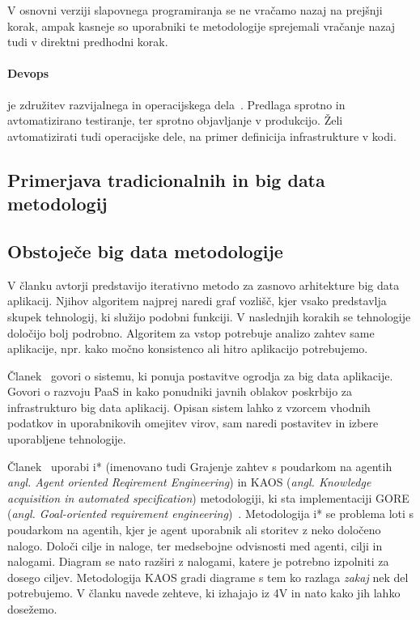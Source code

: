 V osnovni verziji slapovnega programiranja se ne vračamo nazaj na prejšnji korak,
ampak kasneje so uporabniki te metodologije
sprejemali vračanje nazaj tudi v direktni predhodni korak.

\paragraph{Devops} je združitev razvijalnega in operacijskega dela~\cite{devops_meth}.
Predlaga sprotno in avtomatizirano testiranje, ter sprotno objavljanje v produkcijo.
Želi avtomatizirati tudi operacijske dele,
na primer definicija infrastrukture v kodi.

\subsection{Primerjava tradicionalnih in big data metodologij}

\subsection{Obstoječe big data metodologije}
V članku \cite{iterative_methodology} avtorji predstavijo iterativno metodo za zasnovo arhitekture big data aplikacij.
Njihov algoritem najprej naredi graf vozlišč, kjer vsako predstavlja skupek tehnologij, ki služijo podobni funkciji.
V naslednjih korakih se tehnologije določijo bolj podrobno.
Algoritem za vstop potrebuje analizo zahtev same aplikacije, npr. kako močno konsistenco ali hitro aplikacijo potrebujemo.

Članek~\cite{bigprovision} govori o sistemu, ki ponuja postavitve ogrodja za big data aplikacije.
Govori o razvoju PaaS in kako ponudniki javnih oblakov poskrbijo za infrastrukturo big
data aplikacij.
Opisan sistem lahko z vzorcem vhodnih podatkov in uporabnikovih omejitev virov, sam naredi postavitev
in izbere uporabljene tehnologije.

Članek~\cite{modeling_requirements_big_data} uporabi i* 
(imenovano tudi Grajenje zahtev s poudarkom na agentih \emph{angl. Agent oriented Reqirement Engineering})
in KAOS (\emph{angl. Knowledge acquisition in automated specification}) metodologiji, ki sta implementaciji
GORE (\emph{angl. Goal-oriented requirement engineering})~\cite{goal_oriented_requirements_engineering}.
Metodologija i* se problema loti s poudarkom na agentih, kjer je agent uporabnik
ali storitev z neko določeno nalogo.
Določi cilje in naloge, ter medsebojne odvisnosti med agenti, cilji in nalogami.
Diagram se nato razširi z nalogami, katere je potrebno izpolniti za dosego ciljev.
Metodologija KAOS gradi diagrame s tem ko razlaga \emph{zakaj} nek del potrebujemo.
V članku navede zehteve, ki izhajajo iz 4V in nato kako jih lahko dosežemo.